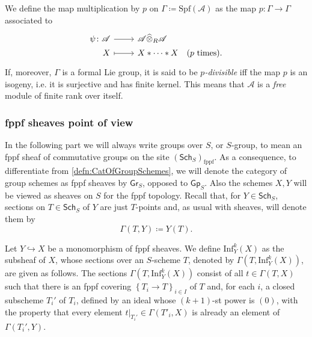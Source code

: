 \documentclass[../Main]{subfiles}
\begin{document}
\begin{defn}\label{defn:pDivisibleFormalLieGroup}
	We define the map multiplication by $p$ on $\Gamma \coloneqq \mathrm{Spf}(\mathscr{A})$
	as the map $p\colon \Gamma \to \Gamma$
	associated to 
	\begin{equation*}
	\begin{tikzcd}[row sep = 0ex
		,/tikz/column 1/.append style={anchor=base east}
		,/tikz/column 2/.append style={anchor=base west}]
		\psi\colon \mathscr{A} \arrow[r, "", rightarrow] &
		\mathscr{A} \widehat{\otimes}_R \mathscr{A} \\
		X \arrow[r, "", mapsto] & 
		X \ast \cdots \ast X
	\quad \text{($p$ times)}
	.\end{tikzcd}
	\end{equation*} 
	If, moreover, $\Gamma$ is a formal Lie group, 
	it is said to be {\em $p$-divisible} iff the map $p$ is 
	an isogeny, i.e. it is surjective and has finite kernel.
	This means that $\mathscr{A}$ is a {\em free} module of finite rank over itself.
\end{defn}



\subsubsection{fppf sheaves point of view}
In the following part we will always write groups over $S$, or $S$-group, to mean
an fppf sheaf of commutative groups on the site $(\mathsf{Sch}_{ S })_{\mathrm{fppf}}$.
As a consequence, to differentiate from \cref{defn:CatOfGroupSchemes}, we will
denote the category of group schemes as fppf sheaves by $\mathsf{Gr}_S$,
opposed to $\mathsf{Gp}_S$.
Also the schemes $X, Y$ will be viewed as sheaves on $S$
for the fppf topology.
Recall that, for $Y \in \mathsf{Sch}_{ S }$, sections on
$T \in \mathsf{Sch}_{ S }$ of $Y$ are just $T$-points and,
as usual with sheaves, will denote them by
\begin{equation*}
	\Gamma \left( T, Y \right) \coloneqq Y(T)
.\end{equation*}


\begin{defn}\label{defn:kInfNeighbourhood}
	Let $Y \hookrightarrow X$ be a monomorphism of fppf sheaves.
	We define $\mathrm{Inf}_Y^k(X)$ as the subsheaf of $X$,
	whose sections over an $S$-scheme $T$, denoted by $\Gamma ( T , \mathrm{Inf}_Y^k(X) )$,
	are given as follows.
	The sections $\Gamma ( T , \mathrm{Inf}_Y^k(X) )$ consist of all
	$t \in \Gamma \left( T, X \right)$ such that
	there is an fppf covering $\left\{ T_{ i } \to T \right\}_{ i \in I }$
	of $T$ and, for each $i$, a closed subscheme $T_i'$ of $T_i$,
	defined by an ideal whose $(k+1)$-st power is $(0)$,
	with the property that every element $\left.t\right|_{T_i'} \in \Gamma(T'_i, X)$
	is already an element of $\Gamma(T_i', Y)$.
\end{defn}
\end{document}
